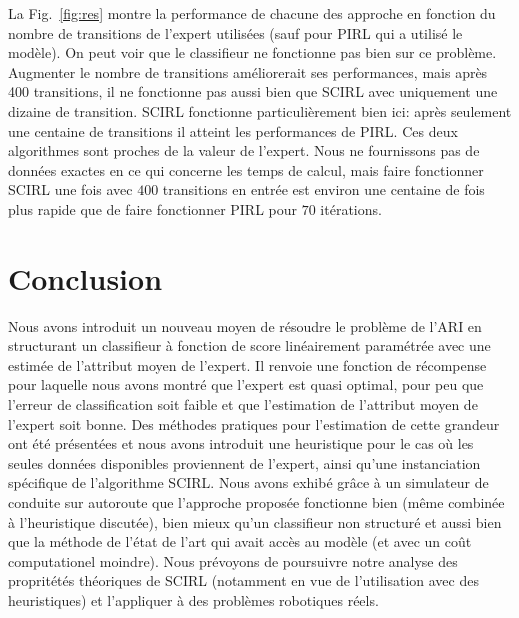 \documentclass[english,utf8]{./hermes-journal}
\begin{document}
La Fig.~\ref{fig:res} montre la performance de chacune des approche en fonction du nombre de transitions de l'expert utilisées (sauf pour PIRL qui a utilisé le modèle). On peut voir que le classifieur ne fonctionne pas bien sur ce problème. Augmenter le nombre de transitions améliorerait ses performances, mais après 400 transitions, il ne fonctionne pas aussi bien que SCIRL avec uniquement une dizaine de transition. SCIRL fonctionne particulièrement bien ici: après seulement une centaine de transitions il atteint les performances de PIRL. Ces deux algorithmes sont proches de la valeur de l'expert. Nous ne fournissons pas de données exactes en ce qui concerne les temps de calcul, mais faire fonctionner SCIRL une fois avec $400$ transitions en entrée est environ une centaine de fois plus rapide que de faire fonctionner PIRL pour $70$ itérations.
%



\section{Conclusion}
\label{sec:conclusion}

Nous avons introduit un nouveau moyen de résoudre le problème de l'ARI en structurant un classifieur à fonction de score linéairement paramétrée avec une estimée de l'attribut moyen de l'expert. Il renvoie une fonction de récompense pour laquelle nous avons montré que l'expert est quasi optimal, pour peu que l'erreur de classification soit faible et que l'estimation de l'attribut moyen de l'expert soit bonne. Des méthodes pratiques pour l'estimation de cette grandeur ont été présentées et nous avons introduit une heuristique pour le cas où les seules données disponibles proviennent de l'expert, ainsi qu'une instanciation spécifique de l'algorithme SCIRL. Nous avons exhibé grâce à un simulateur de conduite sur autoroute que l'approche proposée fonctionne bien (même combinée à l'heuristique discutée), bien mieux qu'un classifieur non structuré et aussi bien que la méthode de l'état de l'art qui avait accès au modèle (et avec un coût computationel moindre). Nous prévoyons de poursuivre notre analyse des propritétés théoriques de SCIRL (notamment en vue de l'utilisation avec des heuristiques) et l'appliquer à des problèmes robotiques réels.


\newpage

\end{document}
